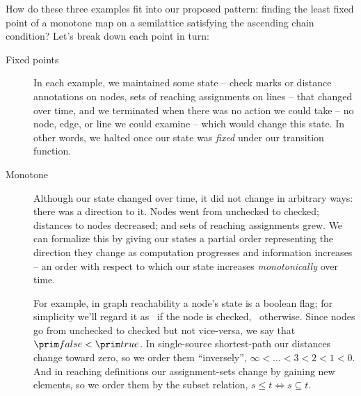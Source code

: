 \noindent
How do these three examples fit into our proposed pattern: finding the least fixed point of a monotone map on a semilattice satisfying the ascending chain condition? Let's break down each point in turn:

\begin{description}
\item[Fixed points]

  In each example, we maintained some state -- check marks or distance
  annotations on nodes, sets of reaching assignments on lines -- that changed
  over time, and we terminated when there was no action we could take -- no
  node, edge, or line we could examine -- which would change this state. In
  other words, we halted once our state was \emph{fixed} under our transition
  function.

\item[Monotone]

  Although our state changed over time, it did not change in arbitrary ways:
  there was a direction to it. Nodes went from unchecked to checked; distances
  to nodes decreased; and sets of reaching assignments grew.
%
  We can formalize this by giving our states a partial order representing the
  direction they change as computation progresses and information increases --
  an order with respect to which our state increases \emph{monotonically} over
  time.

  For example, in graph reachability a node's state is a boolean flag; for
  simplicity we'll regard it as \etrue\ if the node is checked,
  \efalse\ otherwise.
%
  Since nodes go from unchecked to checked but not vice-versa, we say that
  $\efalse < \etrue$.
%
  In single-source shortest-path our distances change toward zero, so we order
  them ``inversely'', $\infty < \hdots < 3 < 2 < 1 < 0$.
%
  And in reaching definitions our assignment-sets change by gaining new
  elements, so we order them by the subset relation, $s \le t \iff s \subseteq
  t$.




\end{description}

